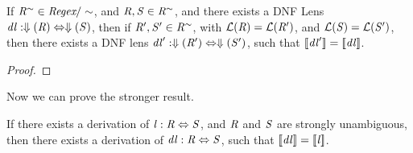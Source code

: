 \documentclass[numbers]{sigplanconf}
\begin{document}
\begin{lemma}
\label{lem:eqclass-semantic-retention}
If $\mathit{R}^{\sim}\in\textit{Regex}/\sim$, and
$\mathit{R},\mathit{S}\in\mathit{R}^{\sim}$, and there exists a DNF Lens
$\mathit{dl} : \Downarrow(\mathit{R}) \Leftrightarrow \Downarrow(\mathit{S})$,
then if $\mathit{R}',\mathit{S}'\in\mathit{R}^{\sim}$,
with $\mathcal{L}(\mathit{R})=\mathcal{L}(\mathit{R}')$,
and $\mathcal{L}(\mathit{S})=\mathcal{L}(\mathit{S}')$,
then there exists a DNF lens
$\mathit{dl}' : \Downarrow(\mathit{R}') \Leftrightarrow \Downarrow(\mathit{S}')$,
such that $[ \! [\mathit{dl}'] \! ]=[ \! [\mathit{dl}] \! ]$.
\end{lemma}
\begin{proof}
\end{proof}

Now we can prove the stronger result.
\begin{theorem}
If there exists a derivation of
$\mathit{l} : \mathit{R} \Leftrightarrow \mathit{S}$,
and $\mathit{R}$ and $\mathit{S}$ are strongly unambiguous,
then there exists a derivation of
$\mathit{dl} : \mathit{R} \Leftrightarrow \mathit{S}$,
such that 
$[ \! [\mathit{dl}] \! ]=[ \! [\mathit{l}] \! ]$.
\end{theorem}
\end{document}
